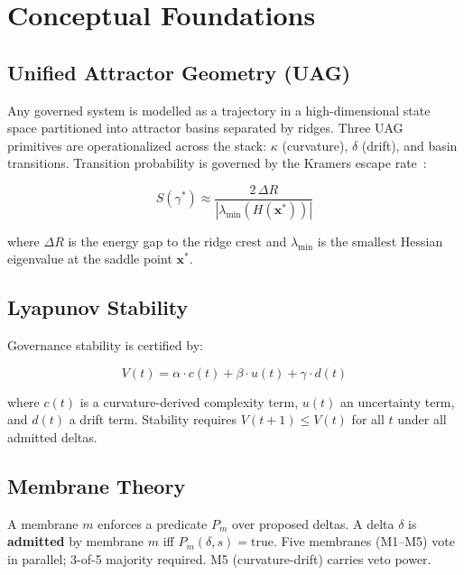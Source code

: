 \documentclass[11pt]{article}
\begin{document}
\section{Conceptual Foundations}

\subsection{Unified Attractor Geometry (UAG)}

Any governed system is modelled as a trajectory in a high-dimensional state space partitioned
into attractor basins separated by ridges. Three UAG primitives are operationalized across the
stack: $\kappa$ (curvature), $\delta$ (drift), and basin transitions. Transition probability is
governed by the Kramers escape rate~\cite{byte2026uag}:

\begin{equation}
S(\gamma^*) \approx \frac{2\,\Delta R}{|\lambda_{\min}(H(\mathbf{x}^*))|}
\end{equation}

where $\Delta R$ is the energy gap to the ridge crest and $\lambda_{\min}$ is the smallest
Hessian eigenvalue at the saddle point $\mathbf{x}^*$.

\subsection{Lyapunov Stability}

Governance stability is certified by:

\begin{equation}
V(t) = \alpha \cdot c(t) + \beta \cdot u(t) + \gamma \cdot d(t)
\end{equation}

where $c(t)$ is a curvature-derived complexity term, $u(t)$ an uncertainty term, and $d(t)$ a
drift term. Stability requires $V(t+1) \leq V(t)$ for all $t$ under all admitted deltas.

\subsection{Membrane Theory}

A membrane $m$ enforces a predicate $P_m$ over proposed deltas. A delta $\delta$ is
\textbf{admitted} by membrane $m$ iff $P_m(\delta, s) = \mathrm{true}$. Five membranes
(M1--M5) vote in parallel; 3-of-5 majority required. M5 (curvature-drift) carries veto power.

\end{document}
